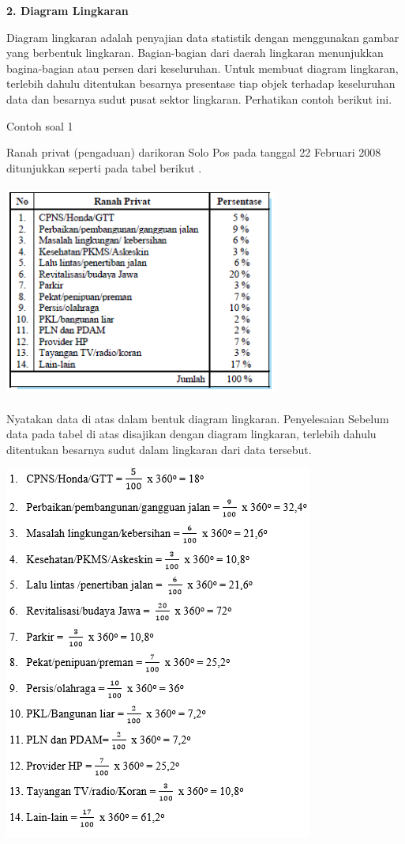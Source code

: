 \documentclass[11pt,fleqn]{book} %
\begin{document}
{\textbf{2.	Diagram Lingkaran}


Diagram lingkaran adalah penyajian data statistik dengan menggunakan gambar yang berbentuk lingkaran. Bagian-bagian dari daerah lingkaran menunjukkan bagina-bagian atau persen dari keseluruhan. Untuk membuat diagram lingkaran, terlebih dahulu ditentukan besarnya presentase tiap objek terhadap keseluruhan data dan besarnya sudut pusat sektor lingkaran. Perhatikan contoh berikut ini.

Contoh soal 1


Ranah privat (pengaduan) darikoran Solo Pos pada tanggal 22 Februari 2008 ditunjukkan seperti pada tabel berikut .


\includegraphics[width = 9cm, height= 7cm]{Pictures/Gb7_diana.png}

Nyatakan data di atas dalam bentuk diagram lingkaran.
Penyelesaian
Sebelum data pada tabel di atas disajikan dengan diagram lingkaran, terlebih dahulu ditentukan besarnya sudut dalam lingkaran dari data tersebut.


\includegraphics[width = 10.16cm, height= 12.36cm]{Pictures/Gb8_diana.png}


}
\end{document}
